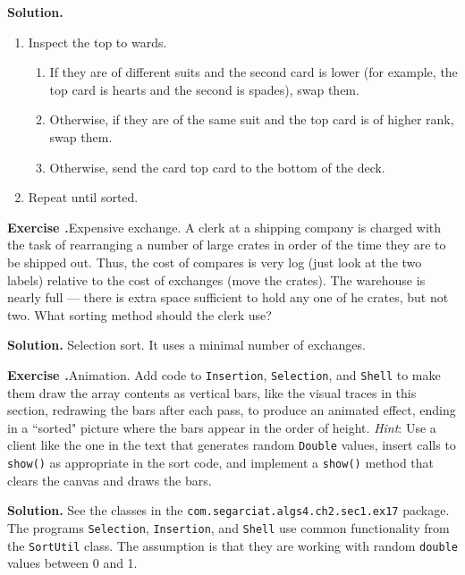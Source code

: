 \documentclass[12pt, a4paper]{article}
\newenvironment{ex}[2][Exercise]
{\par\medskip\noindent \textbf{#1 #2.}}
{\medskip}
\newenvironment{sol}[1][Solution]
{\par\medskip\noindent \textbf{#1.} }
{\medskip}
\begin{document}
	\begin{sol}
		\begin{enumerate}
			\item Inspect the top to wards.
			\begin{enumerate}
				\item If they are of different suits and the second card is lower (for example,
				the top card is hearts and the second is spades), swap them.
				\item Otherwise, if they are of the same suit and the top card is of higher
				rank, swap them.
				\item Otherwise, send the card top card to the bottom of the deck.
			\end{enumerate}
			\item Repeat until sorted.
		\end{enumerate}
	\end{sol}
	\begin{ex}{15}
		\emph{Expensive exchange}. A clerk at a shipping company is charged with the task of rearranging
		a number of large crates in order of the time they are to be shipped out. Thus, the cost
		of compares is very log (just look at the two labels) relative to the cost of exchanges
		(move the crates). The warehouse is nearly full --- there is extra space sufficient to hold
		any one of he crates, but not two. What sorting method should the clerk use?
	\end{ex}
	\begin{sol}
		Selection sort. It uses a minimal number of exchanges.
	\end{sol}
	\begin{ex}{17}
		\emph{Animation}. Add code to \texttt{Insertion}, \texttt{Selection}, and \texttt{Shell}
		to make them draw the array contents as vertical bars, like the visual traces in this
		section, redrawing the bars after each pass, to produce an animated effect, ending in
		a ``sorted" picture where the bars appear in the order of height.
		\emph{Hint}: Use a client like the one in the text that generates random \texttt{Double}
		values, insert calls to \texttt{show()} as appropriate in the sort code, and implement
		a \texttt{show()} method that clears the canvas and draws the bars.
	\end{ex}
	\begin{sol}
		See the classes in the \texttt{com.segarciat.algs4.ch2.sec1.ex17} package.
		The programs \texttt{Selection}, \texttt{Insertion}, and \texttt{Shell}
		use common functionality from the \texttt{SortUtil} class. The
		assumption is that they are working with random \texttt{double} values
		between 0 and 1.
	\end{sol}
\end{document}
